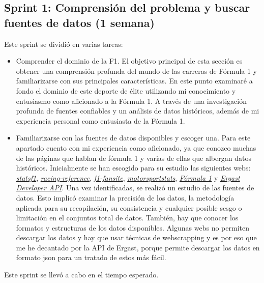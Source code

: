 \subsection{Sprint 1: Comprensión del problema y buscar fuentes de datos (1 semana)} 
Este sprint se dividió en varias tareas:
\begin{itemize}
    \item
    Comprender el dominio de la F1.
    El objetivo principal de esta sección es obtener una comprensión profunda del mundo de las carreras de Fórmula 1 y familiarizarse con sus principales características. En este punto examinaré a fondo el dominio de este deporte de élite utilizando mi conocimiento y entusiasmo como aficionado a la Fórmula 1.
    A través de una investigación profunda de fuentes confiables y un análisis de datos históricos, además de mi experiencia personal como entusiasta de la Fórmula 1.
    \item
    Familiarizarse con las fuentes de datos disponibles y escoger una.
    Para este apartado cuento con mi experiencia como aficionado, ya que conozco muchas de las páginas que hablan de fórmula 1 y varias de ellas que albergan datos históricos. Inicialmente se han escogido para su estudio las siguientes webs: \href{https://www.statsf1.com/}{\textit{statsf1}}, \href{https://www.racing-reference.info/}{\textit{racing-reference}}, \href{https://www.f1-fansite.com/}{\textit{f1-fansite}},  \href{https://www.motorsportstats.com/}{\textit{motorsportstats}}, \href{https://www.formula1.com/}{\textit{Fórmula 1}} y \href{https://ergast.com/mrd/}{\textit{Ergast Developer API}}. 
    Una vez identificadas, se realizó un estudio de las fuentes de datos. Esto implicó examinar la precisión de los datos, la metodología aplicada para su recopilación, su consistencia y cualquier posible sesgo o limitación en el conjuntos total de datos. También, hay que conocer los formatos y estructuras de los datos disponibles. Algunas webs no permiten descargar los datos y hay que usar técnicas de webscrapping y es por eso que me he decantado por la API de Ergast, porque permite descargar los datos en formato json para un tratado de estos más fácil.
\end{itemize}

Este sprint se llevó a cabo en el tiempo esperado.

